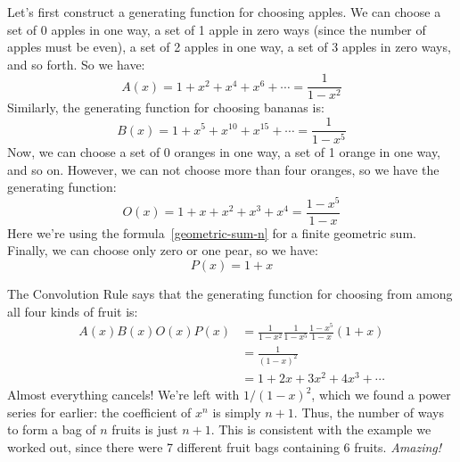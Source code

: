 Let's first construct a generating function for choosing apples.  We
can choose a set of 0 apples in one way, a set of 1 apple in zero
ways (since the number of apples must be even), a set of 2 apples in
one way, a set of 3 apples in zero ways, and so forth.  So we have:
%
\[
A(x) = 1 + x^2 + x^4 + x^6 + \cdots = \frac{1}{1 - x^2}
\]
%
Similarly, the generating function for choosing bananas is:
%
\[
B(x) = 1 + x^5 + x^{10} + x^{15} + \cdots = \frac{1}{1 - x^5}
\]
Now, we can choose a set of 0 oranges in one way, a set of 1 orange in
one way, and so on.  However, we can not choose more than four
oranges, so we have the generating function:
%
\[
O(x) = 1 + x + x^2 + x^3 + x^4 = \frac{1-x^5}{1-x}
\]
Here we're using the formula~\eqref{geometric-sum-n} for a finite
geometric sum.  Finally, we can choose only zero or one pear, so we
have:
%
\[
P(x) = 1 + x
\]

The Convolution Rule says that the generating function for choosing
from among all four kinds of fruit is:
%
\begin{align*}
A(x) B(x) O(x) P(x)
    & = \frac{1}{1-x^2} \frac{1}{1-x^5} \frac{1-x^5}{1-x} (1 + x) \\
    & = \frac{1}{(1-x)^2} \\
    & = 1 + 2x + 3x^2 + 4 x^3 + \cdots
\end{align*}
%
Almost everything cancels!  We're left with $1 / (1-x)^2$, which we
found a power series for earlier: the coefficient of $x^n$ is simply
$n+1$.  Thus, the number of ways to form a bag of $n$ fruits is just
$n+1$.  This is consistent with the example we worked out, since there
were 7 different fruit bags containing 6 fruits.  \textit{Amazing!}

\begin{problems}

\homeworkproblems
{}



\examproblems
{}

\end{problems}

\endinput
